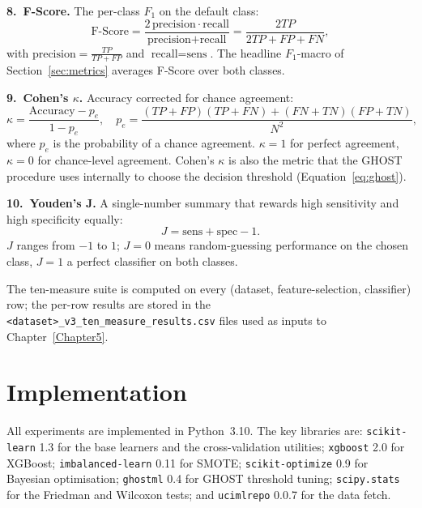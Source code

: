 \textbf{8.\ F-Score.}  The per-class $F_1$ on the default class:
\begin{equation}
\text{F-Score}
=
\frac{2\,\text{precision}\cdot\text{recall}}{\text{precision}+\text{recall}}
=
\frac{2TP}{2TP+FP+FN},
\tag{4.8}
\label{eq:fscore}
\end{equation}
with $\text{precision}=\frac{TP}{TP+FP}$ and
$\text{recall}=\text{sens}$.  The headline $F_1$-macro of
Section~\ref{sec:metrics} averages F-Score over both classes.

\textbf{9.\ Cohen's $\kappa$.}  Accuracy corrected for chance
agreement:
\begin{equation}
\kappa
=
\frac{\text{Accuracy}-p_e}{1-p_e},
\quad
p_e=\frac{(TP+FP)(TP+FN)+(FN+TN)(FP+TN)}{N^{2}},
\tag{4.9}
\label{eq:kappa}
\end{equation}
where $p_e$ is the probability of a chance agreement.
$\kappa = 1$ for perfect agreement, $\kappa = 0$ for chance-level
agreement.  Cohen's $\kappa$ is also the metric that the GHOST
procedure uses internally to choose the decision threshold
(Equation~\eqref{eq:ghost}).

\textbf{10.\ Youden's J.}  A single-number summary that rewards
high sensitivity and high specificity equally:
\begin{equation}
J=\text{sens}+\text{spec}-1.
\tag{4.10}
\label{eq:youden}
\end{equation}
$J$ ranges from $-1$ to $1$; $J=0$ means random-guessing performance
on the chosen class, $J=1$ a perfect classifier on both classes.

The ten-measure suite is computed on every (dataset,
feature-selection, classifier) row; the per-row results are stored
in the \texttt{<dataset>\_v3\_ten\_measure\_results.csv} files used
as inputs to Chapter~\ref{Chapter5}.

\section{Implementation}
\label{sec:implementation}

All experiments are implemented in Python~3.10. The key libraries
are: \texttt{scikit-learn} 1.3 for the base learners and the
cross-validation utilities; \texttt{xgboost} 2.0 for XGBoost;
\texttt{imbalanced-learn} 0.11 for SMOTE; \texttt{scikit-optimize} 0.9
for Bayesian optimisation; \texttt{ghostml} 0.4 for GHOST threshold
tuning; \texttt{scipy.stats} for the Friedman and Wilcoxon tests;
and \texttt{ucimlrepo} 0.0.7 for the data fetch.

